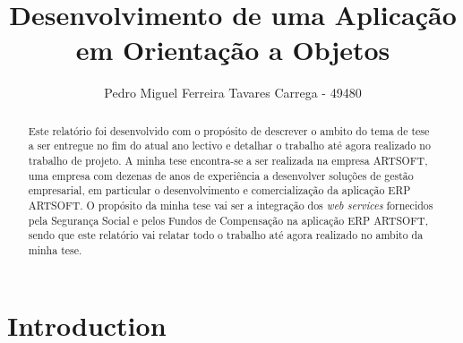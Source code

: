 \documentclass[sigplan]{acmart}
\begin{document}
\title{Desenvolvimento de uma Aplicação em Orientação a Objetos}


\author{Pedro Miguel Ferreira Tavares Carrega - 49480}


\renewcommand{\shortauthors}{Pedro Miguel Ferreira Tavares Carrega - 49480}

\begin{abstract}
  Este relatório foi desenvolvido com o propósito de descrever o ambito do tema de tese a ser entregue no fim do atual ano lectivo e detalhar o trabalho até agora realizado no trabalho de projeto. A minha tese encontra-se a ser realizada na empresa ARTSOFT, uma empresa com dezenas de anos de experiência a desenvolver soluções de gestão empresarial, em particular o desenvolvimento e comercialização da aplicação ERP ARTSOFT. O propósito da minha tese vai ser a integração dos \textit{web services} fornecidos pela Segurança Social e pelos Fundos de Compensação na aplicação ERP ARTSOFT, sendo que este relatório vai relatar todo o trabalho até agora realizado no ambito da minha tese.
\end{abstract}




\maketitle

\section{Introduction}
\end{document}
